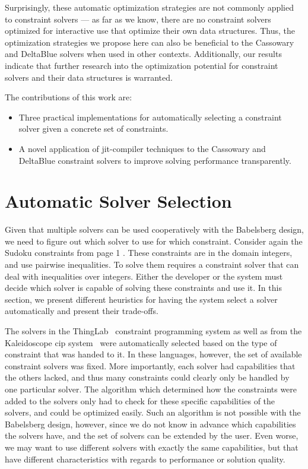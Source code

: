 \documentclass[numbers]{sigplanconf}
\newcommand{\ac}[1]{\gls{#1}}
\begin{document}
Surprisingly, these automatic optimization strategies are not commonly applied
to constraint solvers --- as far as we know, there are no constraint solvers
optimized for interactive use that optimize their own data structures. Thus, the
optimization strategies we propose here can also be beneficial to the Cassowary
and DeltaBlue solvers when used in other contexts. Additionally, our results
indicate that further research into the optimization potential for constraint
solvers and their data structures is warranted.

The contributions of this work are:
\begin{itemize}
\item Three practical implementations for automatically selecting a constraint
  solver given a concrete set of constraints.
\item A novel application of \ac{jit}-compiler techniques to the Cassowary and
  DeltaBlue constraint solvers to improve solving performance transparently.
\end{itemize}

\section{Automatic Solver Selection}
\label{sec:autom-solv-select}

Given that multiple solvers can be used cooperatively with the Babelsberg
design, we need to figure out which solver to use for which constraint. Consider
again the Sudoku constraints from page 1%
. These constraints are in
the domain integers, and use pairwise inequalities. To solve them requires a
constraint solver that can deal with inequalities over integers. Either the
developer or the system must decide which solver is capable of solving these
constraints and use it. In this section, we present different heuristics for
having the system select a solver automatically and present their trade-offs.

The solvers in the ThingLab~\cite{borning-toplas-1981} constraint programming
system as well as from the Kaleidoscope \acrlong{cip}
system~\cite{freeman-benson-iccl-1992} were automatically selected based on the
type of constraint that was handed to it. In these languages, however, the set
of available constraint solvers was fixed. More importantly, each solver had
capabilities that the others lacked, and thus many constraints could clearly
only be handled by one particular solver. The algorithm which determined how the
constraints were added to the solvers only had to check for these specific
capabilities of the solvers, and could be optimized easily. Such an algorithm is
not possible with the Babelsberg design, however, since we do not know in
advance which capabilities the solvers have, and the set of solvers can be
extended by the user. Even worse, we may want to use different solvers with
exactly the same capabilities, but that have different characteristics with
regards to performance or solution quality.
\end{document}
